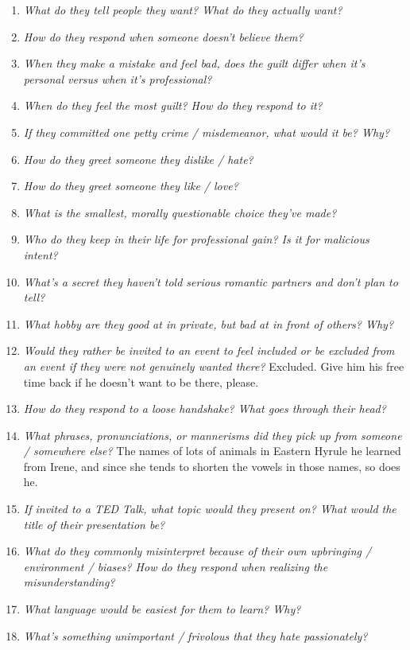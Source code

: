 \begin{enumerate}
    \item\textit{What do they tell people they want? What do they actually want?} 
    \item\textit{How do they respond when someone doesn’t believe them?}
    \item\textit{When they make a mistake and feel bad, does the guilt differ when it’s personal versus when it’s professional?}
    \item\textit{When do they feel the most guilt? How do they respond to it?}
    \item\textit{If they committed one petty crime / misdemeanor, what would it be? Why?} 
    \item\textit{How do they greet someone they dislike / hate?}
    \item\textit{How do they greet someone they like / love?}
    \item\textit{What is the smallest, morally questionable choice they’ve made?}
    \item\textit{Who do they keep in their life for professional gain? Is it for malicious intent?}
    \item\textit{What’s a secret they haven’t told serious romantic partners and don’t plan to tell?}
    \item\textit{What hobby are they good at in private, but bad at in front of others? Why?}
    \item\textit{Would they rather be invited to an event to feel included or be excluded from an event if they were not genuinely wanted there?} Excluded. Give him his free time back if he doesn't want to be there, please.
    \item\textit{How do they respond to a loose handshake? What goes through their head?}
    \item\textit{What phrases, pronunciations, or mannerisms did they pick up from someone / somewhere else?} The names of lots of animals in Eastern Hyrule he learned from Irene, and since she tends to shorten the vowels in those names, so does he. 
    \item\textit{If invited to a TED Talk, what topic would they present on? What would the title of their presentation be?}
    \item\textit{What do they commonly misinterpret because of their own upbringing / environment / biases? How do they respond when realizing the misunderstanding?}
    \item\textit{What language would be easiest for them to learn? Why?}
    \item\textit{What’s something unimportant / frivolous that they hate passionately?} 

\end{enumerate}
